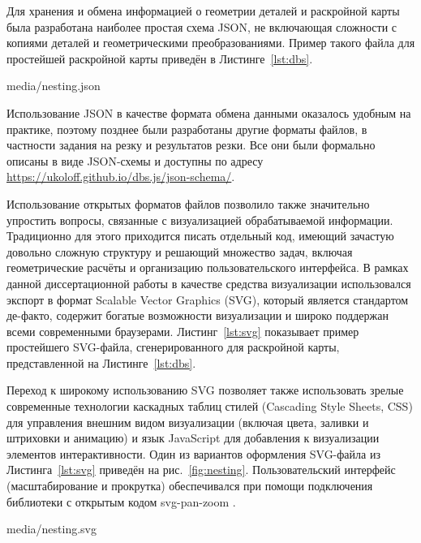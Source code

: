Для хранения и обмена информацией о геометрии деталей
и раскройной карты
была разработана наиболее простая схема JSON,
не включающая сложности с копиями деталей и геометрическими
преобразованиями.
Пример такого файла для простейшей раскройной карты
приведён в Листинге~\ref{lst:dbs}.


    {media/nesting.json}

Использование JSON
в качестве формата обмена данными
оказалось удобным на практике,
поэтому позднее были разработаны другие
форматы файлов, в частности
задания на резку и результатов резки.
Все они были формально описаны в
виде JSON-схемы
\autocite*[]{bi:json-schema}
и доступны по адресу
\url{https://ukoloff.github.io/dbs.js/json-schema/}.

Использование открытых форматов файлов позволило
также значительно упростить вопросы,
связанные с визуализацией обрабатываемой информации.
Традиционно для этого приходится
писать отдельный код,
имеющий зачастую довольно сложную структуру и решающий
множество задач, включая геометрические расчёты
и организацию пользовательского интерфейса.
В рамках данной диссертационной работы
в качестве средства визуализации
использовался экспорт в формат
Scalable Vector Graphics
(SVG),
который является стандартом де-факто,
содержит богатые возможности визуализации
и широко поддержан всеми современными браузерами.
Листинг~\ref{lst:svg}
показывает пример простейшего SVG-файла,
сгенерированного для раскройной карты,
представленной на Листинге~\ref{lst:dbs}.

Переход к широкому использованию SVG
позволяет также использовать зрелые современные технологии
каскадных таблиц стилей
(Cascading Style Sheets, CSS)
для управления внешним видом визуализации
(включая цвета, заливки и штриховки и анимацию)
и язык JavaScript
для добавления к визуализации
элементов интерактивности.
Один из вариантов оформления
SVG-файла из Листинга~\ref{lst:svg}
приведён на рис.~\ref{fig:nesting}.
Пользовательский интерфейс
(масштабирование и прокрутка)
обеспечивался при помощи подключения
библиотеки с открытым кодом
svg-pan-zoom
\autocite*{bi:svg-pan-zoom}.


  {media/nesting.svg}

